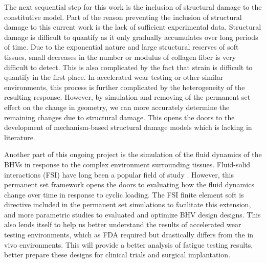     The next sequential step for this work is the inclusion of structural damage to the constitutive model. Part of the reason preventing the inclusion of structural damage to this current work is the lack of sufficient experimental data. Structural damage is difficult to quantify as it only gradually accumulates over long periods of time. Due to the exponential nature and large structural reserves of soft tissues, small decreases in the number or modulus of collagen fiber is very difficult to detect. This is also complicated by the fact that strain is difficult to quantify in the first place. In accelerated wear testing or other similar environments, this process is further complicated by the heterogeneity of the resulting response. However, by simulation and removing of the permanent set effect on the change in geometry, we can more accurately determine the remaining changes due to structural damage. This opens the doors to the development of mechanism-based structural damage models which is lacking in literature. 
    
    
    Another part of this ongoing project is the simulation of the fluid dynamics of the BHVs in response to the complex environment surrounding tissues. Fluid-solid interactions (FSI) have long been a popular field of study \cite{kamensky_immersogeometric_2015}\cite{hsu_dynamic_2015}\cite{wu_anisotropic_2018}\cite{kiendl_isogeometric_2015}. However, this permanent set framework opens the doors to evaluating how the fluid dynamics change over time in response to cyclic loading. The FSI finite element soft is directive included in the permanent set simulations to facilitate this extension, and more parametric studies to evaluated and optimize BHV design designs. This also lends itself to help us better understand the results of accelerated wear testing environments, which as FDA required but drastically differs from the in vivo environments. This will provide a better analysis of fatigue testing results, better prepare these designs for clinical trials and surgical implantation. 
    
